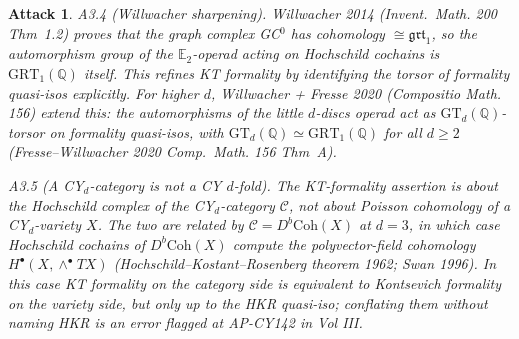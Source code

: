 \documentclass[11pt]{article}
\newtheorem*{attack}{Attack}
\theoremstyle{definition}
\providecommand{\QQ}{\mathbb{Q}}
\providecommand{\cC}{\mathcal{C}}
\providecommand{\Coh}{\mathrm{Coh}}
\begin{document}
\begin{attack}
\emph{A3.4 (Willwacher sharpening).} Willwacher 2014 (\emph{Invent.~Math.}
200 Thm~1.2) proves that the graph complex GC$^0$ has cohomology
$\cong \mathfrak{grt}_1$, so the automorphism group of the
$\mathbb{E}_2$-operad acting on Hochschild cochains is
$\mathrm{GRT}_1(\QQ)$ itself. This refines KT formality by identifying
the torsor of formality quasi-isos explicitly. For higher $d$,
Willwacher + Fresse 2020 (\emph{Compositio Math.} 156) extend this:
the automorphisms of the little $d$-discs operad act as
$\mathrm{GT}_d(\QQ)$-torsor on formality quasi-isos, with
$\mathrm{GT}_d(\QQ) \simeq \mathrm{GRT}_1(\QQ)$ for all $d \geq 2$
(Fresse--Willwacher 2020 \emph{Comp.~Math.} 156 Thm~A).

\emph{A3.5 (A CY$_d$-category is not a CY $d$-fold).} The KT-formality
assertion is about the Hochschild complex of the CY$_d$-\emph{category}
$\cC$, not about Poisson cohomology of a CY$_d$-variety $X$. The two
are related by $\cC = D^b\Coh(X)$ at $d = 3$, in which case
Hochschild cochains of $D^b\Coh(X)$ compute the polyvector-field
cohomology $H^\bullet(X, \wedge^\bullet TX)$ (Hochschild--Kostant--Rosenberg
theorem 1962; Swan 1996). In this case KT formality on the category
side is equivalent to Kontsevich formality on the variety side, but
only up to the HKR quasi-iso; conflating them without naming HKR is
an error flagged at AP-CY142 in Vol III.
\end{attack}
\end{document}
